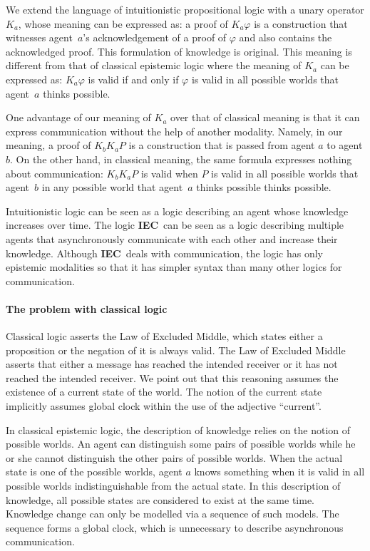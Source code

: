 \documentclass[doctor]{iscs-thesis}
\newcommand{\iec}{{\rm {\textbf{IEC}}}}
\begin{document}
 We extend the language of intuitionistic propositional logic with a unary operator $K_a$,
 whose meaning can be expressed as:
 a proof of $K_a\varphi$ is a construction that witnesses agent~$a$'s
 acknowledgement of a proof of $\varphi$ and also contains the acknowledged
 proof.  This formulation of knowledge is original.
 This meaning is different from that of classical epistemic logic where
 the meaning of $K_a$ can be expressed as:
 $K_a\varphi$ is valid if and only if $\varphi$ is valid in all possible worlds
 that agent~$a$ thinks possible.

 One advantage of our meaning of $K_a$ over that of classical meaning is that
 it can express communication without the help of another modality.
 Namely, in our meaning,
 a proof of $K_bK_a P$ is a construction that is passed from agent $a$ to agent
 $b$.
 On the other hand, in classical meaning, the same formula expresses nothing about
 communication:
 $K_b K_a P$ is valid when $P$ is valid in all possible worlds that agent~$b$ in any
 possible world that agent~$a$ thinks possible thinks possible.

Intuitionistic logic can be seen as a logic describing an agent whose knowledge increases over
time.
The logic \iec\,  can be seen as a logic describing multiple agents
that asynchronously communicate with each other and increase their knowledge.
Although \iec\, deals with communication, the logic has only epistemic modalities so that it
has simpler syntax than many other logics for communication.

\paragraph{The problem with classical logic}
Classical logic asserts the Law of Excluded Middle, which states
either a proposition or the negation of it is always valid.
The Law of Excluded Middle asserts that either 
a message has reached the intended receiver or it has not reached the intended receiver.
We point out that this reasoning assumes the existence of a current state of the world.
The notion of the current state implicitly assumes global clock within the use of the
adjective ``current''.
 
In classical epistemic logic, the description of knowledge relies on the notion of possible
worlds.
An agent can distinguish some pairs of possible worlds while
he or she cannot distinguish the other pairs of possible worlds.
When the actual state is one of the possible worlds,
agent $a$ knows something when it is valid in all possible worlds
indistinguishable from the actual state.
In this description of knowledge,
all possible states are considered to exist at the same time.
Knowledge change can only be modelled via a sequence of such models.
The sequence forms a global clock, which is unnecessary to describe asynchronous
communication.
\end{document}

